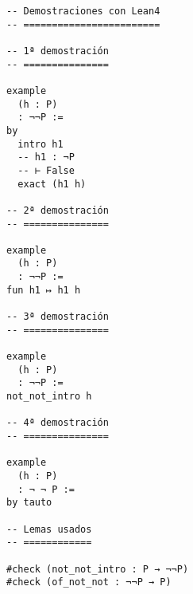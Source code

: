 \begin{verbatim}
-- Demostraciones con Lean4
-- ========================

-- 1ª demostración
-- ===============

example
  (h : P)
  : ¬¬P :=
by
  intro h1
  -- h1 : ¬P
  -- ⊢ False
  exact (h1 h)

-- 2ª demostración
-- ===============

example
  (h : P)
  : ¬¬P :=
fun h1 ↦ h1 h

-- 3ª demostración
-- ===============

example
  (h : P)
  : ¬¬P :=
not_not_intro h

-- 4ª demostración
-- ===============

example
  (h : P)
  : ¬ ¬ P :=
by tauto

-- Lemas usados
-- ============

#check (not_not_intro : P → ¬¬P)
#check (of_not_not : ¬¬P → P)
\end{verbatim}

